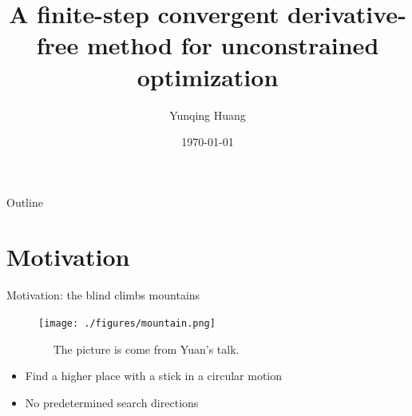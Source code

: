 \documentclass{beamer}
\title[Stick Hill-Climbing Optimization]
{A finite-step convergent derivative-free method for unconstrained
optimization}
\author[Y. Huang, XTU]{Yunqing Huang}
\institute[]{Xiangtan University
\\
\vspace{0.3cm}
joint work with Kai Jiang}
\date{\today }
\begin{document}
\begin{frame}
  \titlepage
\end{frame}

\begin{frame}{Outline}
  \tableofcontents[hideallsubsections]
\end{frame}







\section{Motivation}
\begin{frame}{Motivation: the blind climbs mountains }
\begin{figure}[!htbp]
	\centering
	  \texttt{[image: ./figures/mountain.png]}
	  \caption{~~ The picture is come from Yuan's talk.}
\end{figure}
\begin{itemize}
	\item Find a higher place with a stick in a circular motion
	\item No predetermined search directions
\end{itemize}
\end{frame}
\end{document}
